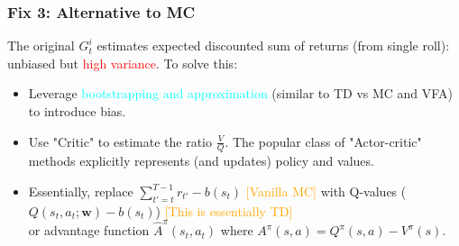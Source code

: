 \documentclass{article}
\begin{document}
\subsubsection{Fix 3: Alternative to MC}
The original $G_{t}^{i}$ estimates expected discounted sum of returns (from single roll): unbiased but \textcolor{red}{high variance}.
To solve this:
\begin{itemize}
\item Leverage \textcolor{cyan}{bootstrapping and approximation} (similar to TD vs MC and VFA) to introduce bias.
\item Use "Critic" to estimate the ratio $\frac{V}{Q}$. The popular class of "Actor-critic" methods explicitly represents (and updates) policy and values.
\item Essentially, replace $\sum_{t' = t}^{T-1} r_{t'} - b(s_t)$ \textcolor{orange}{[Vanilla MC]} 
    with Q-values ($Q(s_t, a_t; \mathbf{w}) - b(s_t)$) \textcolor{orange}{[This is essentially TD]} 
    \\or advantage function $\hat{A}^{\pi}(s_t, a_t)$ where $A^{\pi}(s, a) = Q^{\pi}(s, a) - V^{\pi}(s)$.
\end{itemize}
\end{document}
